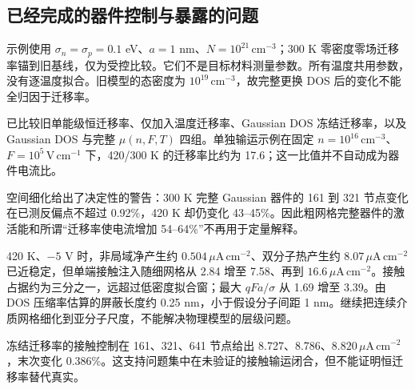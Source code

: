 \documentclass[11pt,a4paper]{article}
\begin{document}
\subsection{{\cjkfont 已经完成的器件控制与暴露的问题}\allowbreak{}}
{\cjkfont 示例使用}\allowbreak{} $\sigma_n=\sigma_p=0.1$ eV{\cjkfont 、}\allowbreak{}$a=1$ nm{\cjkfont 、}\allowbreak{}$N=10^{21}\,\mathrm{cm^{-3}}${\cjkfont ；}\allowbreak{}300 K {\cjkfont 零密度零场迁移率锚到旧基线，仅为受控比较。它们不是目标材料测量参数。所有温度共用参数，没有逐温度拟合。旧模型的态密度为}\allowbreak{} $10^{19}\,\mathrm{cm^{-3}}${\cjkfont ，故完整更换}\allowbreak{} DOS {\cjkfont 后的变化不能全归因于迁移率。}\allowbreak{}

{\cjkfont 已比较旧单能级恒迁移率、仅加入温度迁移率、}\allowbreak{}Gaussian DOS {\cjkfont 冻结迁移率，以及}\allowbreak{} Gaussian DOS {\cjkfont 与完整}\allowbreak{} $\mu(n,F,T)$ {\cjkfont 四组。单独输运示例在固定}\allowbreak{} $n=10^{16}\,\mathrm{cm^{-3}}${\cjkfont 、}\allowbreak{}$F=10^5\,\mathrm{V\,cm^{-1}}$ {\cjkfont 下，}\allowbreak{}420/300 K {\cjkfont 的迁移率比约为}\allowbreak{} 17.6{\cjkfont ；这一比值并不自动成为器件电流比。}\allowbreak{}

{\cjkfont 空间细化给出了决定性的警告：}\allowbreak{}300 K {\cjkfont 完整}\allowbreak{} Gaussian {\cjkfont 器件的}\allowbreak{} 161 {\cjkfont 到}\allowbreak{} 321 {\cjkfont 节点变化在已测反偏点不超过}\allowbreak{} 0.92\%{\cjkfont ，}\allowbreak{}420 K {\cjkfont 却仍变化}\allowbreak{} 43--45\%{\cjkfont 。因此粗网格完整器件的激活能和所谓}\allowbreak{}“{\cjkfont 迁移率使电流增加}\allowbreak{} 54--64\%”{\cjkfont 不再用于定量解释。}\allowbreak{}

420 K{\cjkfont 、}\allowbreak{}$-5$ V {\cjkfont 时，非局域净产生约}\allowbreak{} $0.504\,\mu\mathrm{A\,cm^{-2}}${\cjkfont 、双分子热产生约}\allowbreak{} $8.07\,\mu\mathrm{A\,cm^{-2}}$ {\cjkfont 已近稳定，但单端接触注入随细网格从}\allowbreak{} 2.84 {\cjkfont 增至}\allowbreak{} 7.58{\cjkfont 、再到}\allowbreak{} $16.6\,\mu\mathrm{A\,cm^{-2}}${\cjkfont 。接触占据约为三分之一，远超过低密度拟合窗；最大}\allowbreak{} $qFa/\sigma$ {\cjkfont 从}\allowbreak{} 1.69 {\cjkfont 增至}\allowbreak{} 3.39{\cjkfont 。由}\allowbreak{} DOS {\cjkfont 压缩率估算的屏蔽长度约}\allowbreak{} 0.25 nm{\cjkfont ，小于假设分子间距}\allowbreak{} 1 nm{\cjkfont 。继续把连续介质网格细化到亚分子尺度，不能解决物理模型的层级问题。}\allowbreak{}

{\cjkfont 冻结迁移率的接触控制在}\allowbreak{} 161{\cjkfont 、}\allowbreak{}321{\cjkfont 、}\allowbreak{}641 {\cjkfont 节点给出}\allowbreak{} 8.727{\cjkfont 、}\allowbreak{}8.786{\cjkfont 、}\allowbreak{}$8.820\,\mu\mathrm{A\,cm^{-2}}${\cjkfont ，末次变化}\allowbreak{} 0.386\%{\cjkfont 。这支持问题集中在未验证的接触输运闭合，但不能证明恒迁移率替代真实。}\allowbreak{}
\end{document}
